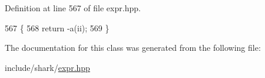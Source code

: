 Definition at line 567 of file expr.\+hpp.


\begin{DoxyCode}
567                                                                                                            
                \{
568                 \textcolor{keywordflow}{return} -a(ii);
569             \}
\end{DoxyCode}


The documentation for this class was generated from the following file\+:\begin{DoxyCompactItemize}
\item 
include/shark/\hyperlink{expr_8hpp}{expr.\+hpp}\end{DoxyCompactItemize}
